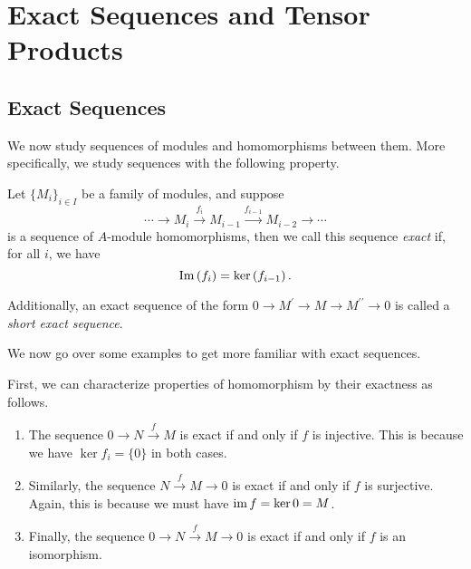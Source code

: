 \chapter{Exact Sequences and Tensor Products}
\section{Exact Sequences}
We now study sequences of modules and homomorphisms between them. More specifically, we study sequences with the following property.
\begin{definition}\label{def: exact}
Let $\{M_i\}_{i\in I}$ be a family of modules, and suppose
\[
\cdots \longrightarrow M_{i} \stackrel{f_{i}}{\longrightarrow} M_{i-1} \stackrel{f_{i-1}}{\longrightarrow} M_{i-2} \rightarrow \cdots
\]
is a sequence of $A$-module homomorphisms, then we call this sequence {\it exact} if, for all $i$, we have 
\[
\operatorname{Im}\left(f_{i}\right)= {\operatorname{\text{ker\/}}}\left(f_{i-1}\right).
\] 
\end{definition}
Additionally, an exact sequence of the form $0 \longrightarrow M^{\prime} \longrightarrow M \longrightarrow M^{\prime \prime} \longrightarrow 0$ is called a {\it short exact sequence}.

We now go over some examples to get more familiar with exact sequences.
\begin{example}
First, we can characterize properties of homomorphism by their exactness as follows. 
    \begin{enumerate}
        \item The sequence $0 \longrightarrow N \stackrel{f}{\longrightarrow} M$ is exact if and only if $f$ is injective. This is because we have \(\ker{f_i} = \{0\}\) in both cases.
        \item Similarly, the sequence $N \stackrel{f}{\longrightarrow} M \longrightarrow 0$ is exact if and only if $f$ is surjective. Again, this is because we must have $\operatorname{\text{im\/}}{f} = \operatorname{\text{ker\/}}{0} = M$.
        \item Finally, the sequence $0 \longrightarrow N \stackrel{f}{\longrightarrow} M \longrightarrow 0$ is exact if and only if $f$ is an isomorphism.
    \end{enumerate}
\end{example}

